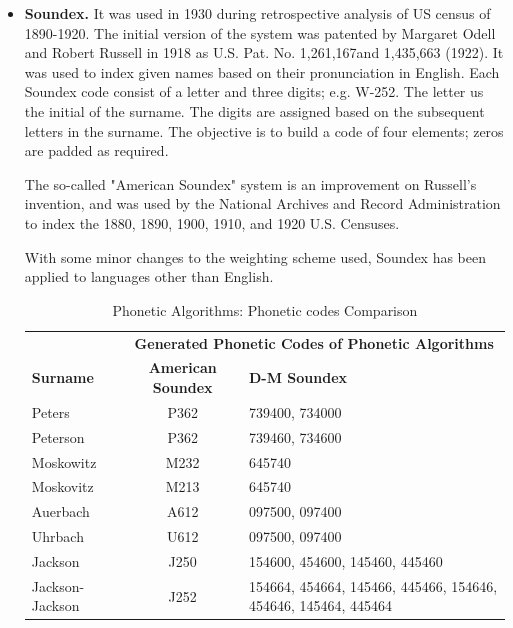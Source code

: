 \documentclass[9pt,conference]{IEEEtran}
\begin{document}
\begin{itemize}
\item \textbf{Soundex.}
It was used in 1930 during retrospective analysis of US census of 1890-1920\cite{ref:01}.  The initial 
version of the system was patented by Margaret Odell and Robert Russell in 1918 as U.S. Pat. No. 1,261,167\cite{ref:33}and 1,435,663 (1922)\cite{ref:34}.
It was used to index given names based on their pronunciation in English. Each Soundex code consist 
of a letter and three digits; e.g. W-252. The letter us the initial of the surname. The digits are assigned 
based on the subsequent letters in the surname. The objective is to build a code of four elements; 
zeros are padded as required\cite{ref:02}\cite{ref:24}.

The so-called "American Soundex" system is an improvement on Russell's invention, and was 
used by the National Archives and Record Administration to index the 1880, 1890, 1900, 1910, 
and 1920 U.S. Censuses\cite{ref:33}.

With some minor changes to the weighting scheme used, Soundex has been applied to languages 
other than English\cite{ref:34}\cite{ref:35}.\\
\begin{table}[b]
\caption{Phonetic Algorithms: Phonetic codes Comparison} \label{tab:02}
\centering
\begin{tabular}{ lcp{} }\\
\toprule[1.5pt]
                             & \multicolumn{2}{c}{\bf Generated Phonetic Codes of Phonetic Algorithms} \\
	\bf Surname & \bf American Soundex & \bf D-M Soundex \\ \hline
         Peters	&P362	&739400, 734000 \\
         Peterson	&P362	&739460, 734600 \\
         Moskowitz &M232	&645740 \\
         Moskovitz	 &M213	&645740 \\
         Auerbach	&A612	&097500, 097400 \\
         Uhrbach	&U612	&097500, 097400 \\
         Jackson	&J250	&154600, 454600, 145460, 445460 \\
         Jackson-Jackson	&J252	&154664, 454664, 145466, 445466, 154646, 454646, 145464, 445464 \\
\bottomrule[1.25pt]
\end{tabular}
\end{table}%


\end{itemize}
\end{document}
